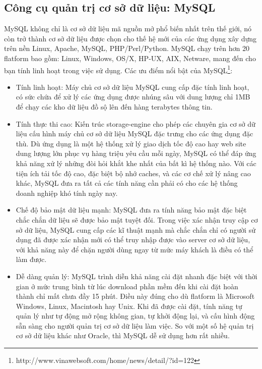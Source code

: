 \documentclass[12pt]{report}
\begin{document}
				\subsection{Công cụ quản trị cơ sở dữ liệu: MySQL}
					\par MySQL không chỉ là cơ sở dữ liệu mã nguồn mở phổ biến nhất trên thế giới, nó còn trở thành cơ sở dữ liệu được chọn cho thế hệ mới của các ứng dụng xây dựng trên nền Linux, Apache, MySQL, PHP/Perl/Python. MySQL chạy trên hơn 20 flatform bao gồm: Linux, Windows, OS/X, HP-UX, AIX, Netware, mang đến cho bạn tính linh hoạt trong việc sử dụng. Các ưu điểm nổi bật của MySQL\footnote{http://www.vinawebsoft.com/home/news/detail/?id=122}:
					\begin{itemize}
						\item {Tính linh hoạt: Máy chủ cơ sở dữ liệu MySQL cung cấp đặc tính linh hoạt, có sức chứa để xử lý các ứng dụng được nhúng sâu với dung lượng chỉ 1MB để chạy các kho dữ liệu đồ sộ lên đến hàng terabytes thông tin. }
						\item {Tính thực thi cao: Kiến trúc storage-engine cho phép các chuyên gia cơ sở dữ liệu cấu hình máy chủ cơ sở dữ liệu MySQL đặc trưng cho các ứng dụng đặc thù. Dù ứng dụng là một hệ thống xử lý giao dịch tốc độ cao hay web site dung lượng lớn phục vụ hàng triệu yêu cầu mỗi ngày, MySQL có thể đáp ứng khả năng xử lý những đòi hỏi khắt khe nhất của bất kì hệ thống nào. Với các tiện ích tải tốc độ cao, đặc biệt bộ nhớ caches, và các cơ chế xử lý nâng cao khác, MySQL đưa ra tất cả các tính năng cần phải có cho các hệ thống doanh nghiệp khó tính ngày nay.}
						\item {Chế độ bảo mật dữ liệu mạnh: MySQL đưa ra tính năng bảo mật đặc biệt chắc chắn dữ liệu sẽ được bảo mật tuyệt đối. Trong việc xác nhận truy cập cơ sở dữ liệu, MySQL cung cấp các kĩ thuật mạnh mà chắc chắn chỉ có người sử dụng đã được xác nhận mới có thể truy nhập được vào server cơ sở dữ liệu, với khả năng này để chặn người dùng ngay từ mức máy khách là điều có thể làm được.}
						\item{Dễ dàng quản lý: MySQL trình diễn khả năng cài đặt nhanh đặc biệt với thời gian ở mức trung bình từ lúc download phần mềm đến khi cài đặt hoàn thành chỉ mất chưa đầy 15 phút. Điều này đúng cho dù flatform là Microsoft Windows, Linux, Macintosh hay Unix. Khi đã được cài đặt, tính năng tự quản lý như tự động mở rộng không gian, tự khởi động lại, và cấu hình động sẵn sàng cho người quản trị cơ sở dữ liệu làm việc. So với một số hệ quản trị cơ sở dữ liệu khác như Oracle, thì MySQL dễ sử dụng hơn rất nhiều.}
					\end{itemize}
\end{document}
